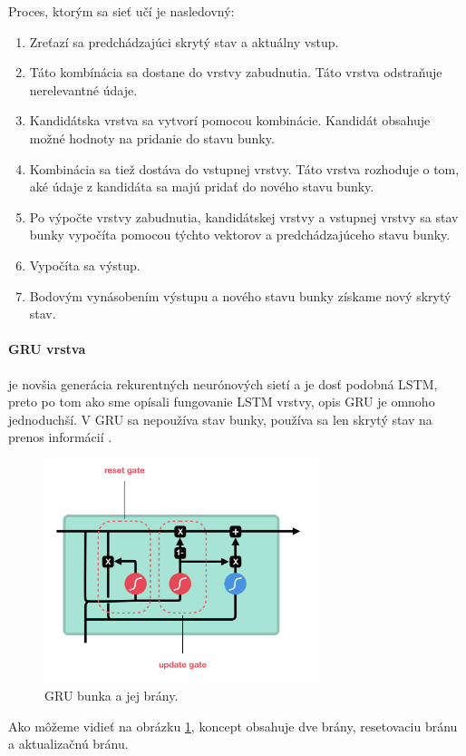 Proces, ktorým sa sieť učí je nasledovný:
\begin{enumerate}
    \item Zreťazí sa predchádzajúci skrytý stav a aktuálny vstup.
    \item Táto kombínácia sa dostane do vrstvy zabudnutia. Táto vrstva odstraňuje nerelevantné údaje.
    \item Kandidátska vrstva sa vytvorí pomocou kombinácie. Kandidát obsahuje možné hodnoty na pridanie do stavu bunky.
    \item Kombinácia sa tiež dostáva do vstupnej vrstvy. Táto vrstva rozhoduje o tom, aké údaje z kandidáta sa majú pridať do nového stavu bunky.
    \item Po výpočte vrstvy zabudnutia, kandidátskej vrstvy a vstupnej vrstvy sa stav bunky vypočíta pomocou týchto vektorov a predchádzajúceho stavu bunky.
    \item Vypočíta sa výstup.
    \item Bodovým vynásobením výstupu a nového stavu bunky získame nový skrytý stav.
\end{enumerate}

\paragraph{GRU vrstva} je novšia generácia rekurentných neurónových sietí a je dosť podobná LSTM, preto po tom ako sme opísali fungovanie LSTM vrstvy, opis GRU je omnoho jednoduchší. V GRU sa nepoužíva stav bunky, používa sa len skrytý stav na prenos informácií \cite{gru}. 

\begin{figure}[!htbp]
  \centering
  \includegraphics[width=8cm]{img/gru.png}
  \caption{GRU bunka a jej brány.}
  \label{gru}
\end{figure}

Ako môžeme vidieť na obrázku \ref{gru}, koncept obsahuje dve brány, resetovaciu bránu a aktualizačnú bránu.

